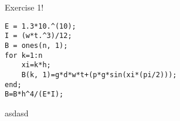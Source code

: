 
%
Exercise 1!
%


\begin{lstlisting}
E = 1.3*10.^(10); 
I = (w*t.^3)/12; 
B = ones(n, 1);
for k=1:n
    xi=k*h; 
    B(k, 1)=g*d*w*t+(p*g*sin(xi*(pi/2)));
end;
B=B*h^4/(E*I);
  \end{lstlisting}
  asdasd